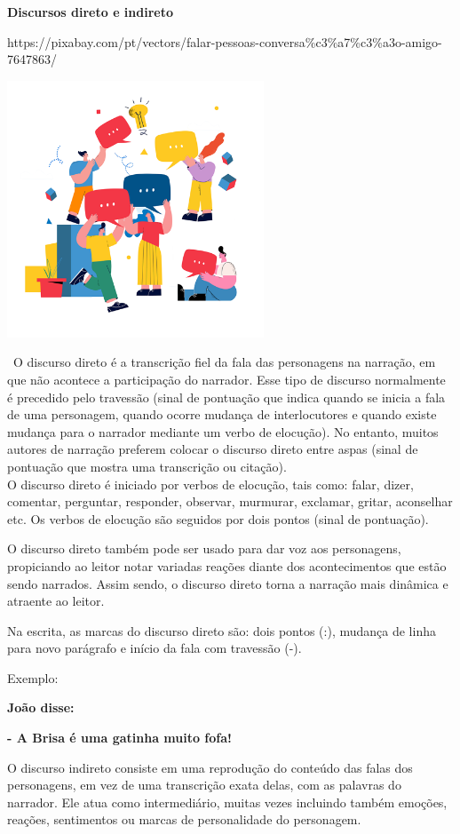 \textbf{Discursos direto e indireto}

https://pixabay.com/pt/vectors/falar-pessoas-conversa\%c3\%a7\%c3\%a3o-amigo-7647863/

\includegraphics[width=3.01042in,height=3.01042in]{media/image18.png}

~O discurso direto é a transcrição fiel da fala das personagens na
narração, em que não acontece a participação do narrador. Esse tipo de
discurso normalmente é precedido pelo travessão (sinal de pontuação que
indica quando se inicia a fala de uma personagem, quando ocorre mudança
de interlocutores e quando existe mudança para o narrador mediante um
verbo de elocução). No entanto, muitos autores de narração preferem
colocar o discurso direto entre aspas (sinal de pontuação que mostra uma
transcrição ou citação).\\
O discurso direto é iniciado por verbos de elocução, tais como: falar,
dizer, comentar, perguntar, responder, observar, murmurar, exclamar,
gritar, aconselhar etc. Os verbos de elocução são seguidos por dois
pontos (sinal de pontuação).

O discurso direto também pode ser usado para dar voz aos personagens,
propiciando ao leitor notar variadas reações diante dos acontecimentos
que estão sendo narrados. Assim sendo, o discurso direto torna a
narração mais dinâmica e atraente ao leitor.

Na escrita, as marcas do discurso direto são: dois pontos (:), mudança
de linha para novo parágrafo e início da fala com travessão (-).

Exemplo:

\textbf{João disse:}

\textbf{- A Brisa é uma gatinha muito fofa!}

O discurso indireto consiste em uma reprodução do conteúdo das falas dos
personagens, em vez de uma transcrição exata delas, com as palavras do
narrador. Ele atua como intermediário, muitas vezes incluindo também
emoções, reações, sentimentos ou marcas de personalidade do personagem.

